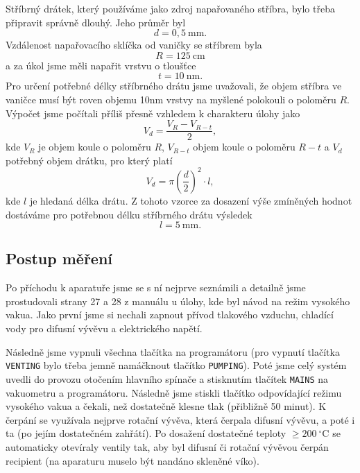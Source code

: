 \documentclass[english]{article}
\newcommand{\unit}[1]{~\mathrm{#1}}
\newcommand{\degc}{^\circ C}
\begin{document}
    	Stříbrný drátek, který používáme jako zdroj napařovaného stříbra, bylo třeba připravit správně dlouhý. Jeho průměr byl
    	\begin{equation}
    		d = 0,5\unit{mm}.
    	\end{equation}
    	Vzdálenost napařovacího sklíčka od vaničky se stříbrem byla
    	\begin{equation}
    		R = 125\unit{cm}
    	\end{equation}
    	a za úkol jsme měli napařit vrstvu o tloušťce
    	\begin{equation}
    		t = 10\unit{nm}.
    	\end{equation}
    	Pro určení potřebné délky stříbrného drátu jsme uvažovali, že objem stříbra ve vaničce musí být roven objemu 10nm vrstvy na myšlené polokouli o poloměru $R$. Výpočet jsme počítali příliš přesně vzhledem k charakteru úlohy jako
    	\begin{equation}
    		V_d = \frac{V_R - V_{R-t}}{2},
    	\end{equation}
    	kde $V_R$ je objem koule o poloměru $R$, $V_{R-t}$ objem koule o poloměru $R-t$ a $V_d$ potřebný objem drátku, pro který platí
    	\begin{equation}
    		V_d = \pi \left(\frac{d}{2}\right)^2\cdot l,
    	\end{equation} 
    	kde $l$ je hledaná délka drátu. Z tohoto vzorce za dosazení výše zmíněných hodnot dostáváme pro potřebnou délku stříbrného drátu výsledek
    	\begin{equation}
    		l = 5\unit{mm}.
    	\end{equation}

    \subsection{Postup měření}				
		Po příchodu k aparatuře jsme se s ní nejprve seznámili a detailně jsme prostudovali strany 27 a 28 z manuálu u úlohy, kde byl návod na režim vysokého vakua. Jako první jsme si nechali zapnout přívod tlakového vzduchu, chladící vody pro difusní vývěvu a elektrického napětí. 
		
		Následně jsme vypnuli všechna tlačítka na programátoru (pro vypnutí tlačítka \texttt{VENTING} bylo třeba jemně namáčknout tlačítko \texttt{PUMPING}). Poté jsme celý systém uvedli do provozu otočením hlavního spínače a stisknutím tlačítek \texttt{MAINS} na vakuometru a programátoru. Následně jsme stiskli tlačítko odpovídající režimu vysokého vakua a čekali, než dostatečně klesne tlak (přibližně 50 minut). K čerpání se využívala nejprve rotační vývěva, která čerpala difusní vývěvu, a poté i ta (po jejím dostatečném zahřátí). Po dosažení dostatečné teploty $\ge 200\unit{\degc}$ se automaticky otevíraly ventily tak, aby byl difusní či rotační vývěvou čerpán recipient (na aparaturu muselo být nandáno skleněné víko). 
	
\end{document}
